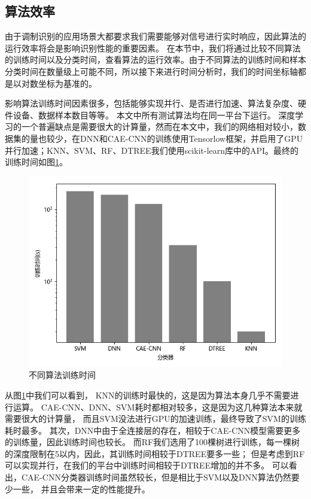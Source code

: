 \subsection{算法效率}

由于调制识别的应用场景大都要求我们需要能够对信号进行实时响应，因此算法的运行效率将会是影响识别性能的重要因素。
在本节中，我们将通过比较不同算法的训练时间以及分类时间，查看算法的运行效率。由于不同算法的训练时间和样本分类时间在数量级上可能不同，所以接下来进行时间分析时，我们的时间坐标轴都是以对数坐标为基准的。\par

影响算法训练时间因素很多，包括能够实现并行、是否进行加速、算法复杂度、硬件设备、数据样本数目等等。
本文中所有测试算法均在同一平台下运行。
深度学习的一个普遍缺点是需要很大的计算量，然而在本文中，我们的网络相对较小，数据集的量也较少，在DNN和CAE-CNN的训练使用Tensorlow框架，并启用了GPU并行加速；KNN、SVM、RF、DTREE我们使用scikit-learn库中的API。最终的训练时间如图\ref{sec:fig_3_12}。\par
\begin{figure}[!h]
	\centering
	\includegraphics[scale=0.65]{figures/chapter_3/fig_3_12}
	\caption{不同算法训练时间}	\label{sec:fig_3_12}
\end{figure}
从图\ref{sec:fig_3_12}中我们可以看到，
KNN的训练时最快的，这是因为算法本身几乎不需要进行运算。
CAE-CNN、DNN、SVM耗时都相对较多，这是因为这几种算法本来就需要很大的计算量，
而且SVM没法进行GPU的加速训练，最终导致了SVM的训练耗时最多。
其次，DNN中由于全连接层的存在，相较于CAE-CNN模型需要更多的训练量，因此训练时间也较长。
而RF我们选用了100棵树进行训练，每一棵树的深度限制在5以内，因此，其训练时间相较于DTREE要多一些；
但是考虑到RF可以实现并行，在我们的平台中训练时间相较于DTREE增加的并不多。
可以看出，CAE-CNN分类器训练时间虽然较长，但是相比于SVM以及DNN算法仍然要少一些，
并且会带来一定的性能提升。\par

